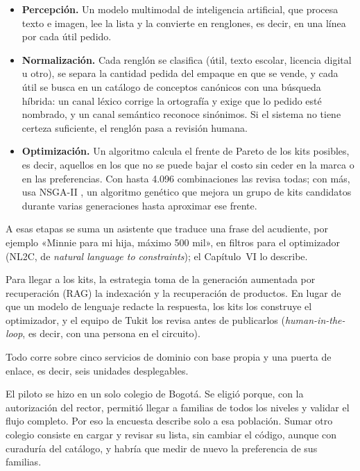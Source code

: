 \begin{itemize}
  \item \textbf{Percepción.} Un modelo multimodal de inteligencia artificial, que procesa texto e imagen, lee la lista y la convierte
        en renglones, es decir, en una línea por cada útil pedido.
  \item \textbf{Normalización.} Cada renglón se clasifica (útil, texto escolar, licencia digital u otro),
        se separa la cantidad pedida del empaque en que se vende, y cada útil se busca en un catálogo de
        conceptos canónicos con una búsqueda híbrida: un canal léxico corrige la ortografía y exige que lo
        pedido esté nombrado, y un canal semántico reconoce sinónimos. Si el sistema no tiene certeza
        suficiente, el renglón pasa a revisión humana.
  \item \textbf{Optimización.} Un algoritmo calcula el frente de Pareto de los kits posibles, es decir,
        aquellos en los que no se puede bajar el costo sin ceder en la marca o en las preferencias. Con
        hasta 4.096 combinaciones las revisa todas; con más, usa NSGA-II \citep{deb_fast_2002}, un algoritmo genético que mejora un grupo de kits candidatos durante varias generaciones hasta aproximar ese frente.
\end{itemize}

A esas etapas se suma un asistente que traduce una frase del acudiente, por ejemplo «Minnie para mi hija, máximo 500 mil», en filtros para el optimizador (NL2C, de \emph{natural language to constraints}); el Capítulo~VI lo describe.\par

Para llegar a los kits, la estrategia toma de la generación aumentada por recuperación (RAG) \citep{lewis_retrieval-augmented_2020}
la indexación y la recuperación de productos. En lugar de que un modelo de
lenguaje redacte la respuesta, los kits los construye el optimizador, y el equipo de Tukit los revisa antes de publicarlos (\emph{human-in-the-loop}, es decir, con una persona en el circuito).\par

Todo corre sobre cinco servicios de dominio con base propia y una puerta de enlace, es decir, seis unidades desplegables.\par

El piloto se hizo en un solo colegio de Bogotá. Se eligió porque, con la autorización del rector, permitió llegar a familias de todos los niveles y validar el flujo completo. Por eso la encuesta describe solo a esa población. Sumar otro colegio consiste en cargar y revisar su lista, sin cambiar el código, aunque con curaduría del catálogo, y habría que medir de nuevo la preferencia de sus familias.\par

